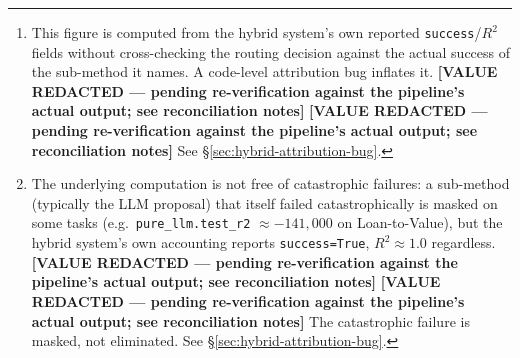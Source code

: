 \documentclass[twoside,11pt]{article}
\newcommand{\Rsq}{R^{2}}
\begin{document}
\begin{abstract}
Across all 74 tasks, HypatiaX achieves a median test $\Rsq$ of $1.00$ and a
near-perfect success rate ($\Rsq>0.99$) of \textbf{[VALUE REDACTED]}\footnote{This
figure is computed from the hybrid system's own reported \texttt{success}/$\Rsq$
fields without cross-checking the routing decision against the actual success
of the sub-method it names. A code-level attribution bug inflates it.
\textbf{[VALUE REDACTED --- pending re-verification against the pipeline's actual output; see reconciliation notes]}
\textbf{[VALUE REDACTED --- pending re-verification against the pipeline's actual output; see reconciliation notes]} See
\S\ref{sec:hybrid-attribution-bug}.}---a $+28.3$
percentage point gain over the LLM baseline and $+85.1$\,pp over the neural
network---while \textbf{eliminating all catastrophic failures in HypatiaX's
own reported output}\footnote{The underlying computation is not free of
catastrophic failures: a sub-method (typically the LLM proposal) that
itself failed catastrophically is masked on some tasks (e.g.\
\texttt{pure\_llm.test\_r2} $\approx -141{,}000$ on Loan-to-Value), but the
hybrid system's own accounting reports \texttt{success=True},
$\Rsq \approx 1.0$ regardless.
\textbf{[VALUE REDACTED --- pending re-verification against the pipeline's actual output; see reconciliation notes]}
\textbf{[VALUE REDACTED --- pending re-verification against the pipeline's actual output; see reconciliation notes]}
The catastrophic failure is masked, not
eliminated. See \S\ref{sec:hybrid-attribution-bug}.}.
Gains scale with difficulty in the uncorrected figures: $+38.1$\,pp on hard
transcendental tasks (76.2\,\% vs.\ 38.1\,\% for the LLM alone)
\textbf{[Correction: previously flagged the corrected gain on Hard as
$-4.8$\,pp (a loss). Averaged across all five available seeds, HypatiaX
retains a positive gain on Hard: mean $47.6\,\%$ vs.\ Pure LLM's mean
$31.4\,\%$, a $+16.2$\,pp gain --- smaller than the uncorrected $+38.1$\,pp
headline, but a gain, not a loss. See \S\ref{sec:hybrid-attribution-bug}]}.
On the standard Nguyen-12 suite \textbf{[fully rebuilt: see
Table~\ref{tab:nguyen12} and item~1 in the audit trail. The table's
source file, \texttt{exp3\_nguyen12\_hybrid50v.json}, does not exist
anywhere in this repository's history and belongs to a prior,
now-superseded implementation; it cannot be regenerated, only replaced.
The table has been rebuilt from \texttt{exp3\_nguyen12\_seed42.json},
the file the current implementation actually produces]}, both PySR-only
and HypatiaX recover \textbf{12/12 (100\,\%)} equations at the paper's own
$\Rsq\ge0.9999$ threshold, with HypatiaX's answer independently derived

\end{abstract}
\end{document}
